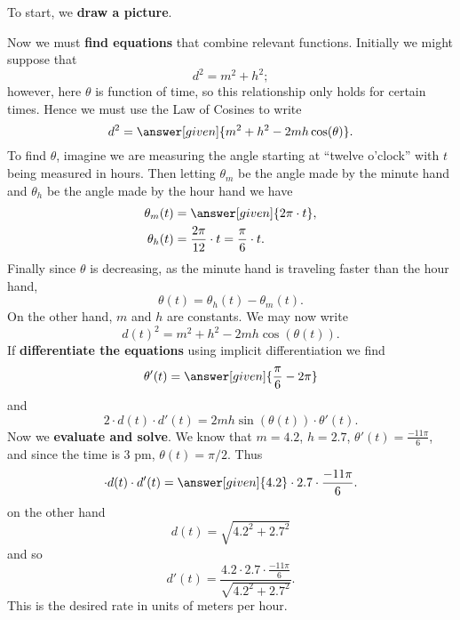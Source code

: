 \documentclass{ximera}
\begin{document}
\begin{example}
  \begin{explanation}
    To start, we \textbf{draw a picture}.
    \begin{image}
    \end{image}
    Now we must \textbf{find equations} that combine relevant
    functions. Initially we might suppose that
    \[
    d^2 = m^2 + h^2;
    \]
    however, here $\theta$ is function of time, so this relationship
    only holds for certain times. Hence we must use the Law of Cosines
    to write
    \[
    d^2 = \answer[given]{m^2 + h^2 - 2mh\cos(\theta)}.
    \]
    To find $\theta$, imagine we are measuring the angle starting at
    ``twelve o'clock'' with $t$ being measured in hours. Then letting
    $\theta_m$ be the angle made by the minute hand and $\theta_h$ be
    the angle made by the hour hand we have
    \begin{align*}
      \theta_m(t) &= \answer[given]{2\pi \cdot t},\\
      \theta_h(t) &= \frac{2\pi}{12}\cdot t =\frac{\pi}{6}\cdot t.
    \end{align*}
    Finally since $\theta$ is decreasing, as the minute hand is
    traveling faster than the hour hand,
    \[
    \theta(t) = \theta_h(t) - \theta_m(t).
    \]
    On the other hand, $m$ and $h$ are constants. We may now write
    \[
    d(t)^2 = m^2 + h^2 - 2mh\cos(\theta(t)).
    \]
    If \textbf{differentiate the equations} using implicit
    differentiation we find
    \[
    \theta'(t) = \answer[given]{\frac{\pi}{6}-2\pi}
    \]
    and
    \[
    2\cdot d(t) \cdot d'(t)  = 2mh\sin(\theta(t))\cdot \theta'(t).
    \]
    Now we \textbf{evaluate and solve}.  We know that $m=4.2$,
    $h=2.7$, $\theta'(t) = \frac{-11\pi}{6}$, and since the time is $3$
    pm, $\theta(t) = \pi/2$. Thus
    \[
    \cdot d(t) \cdot d'(t)  = \answer[given]{4.2}\cdot 2.7\cdot \frac{-11\pi}{6}.
    \]
    on the other hand
    \[
    d(t) = \sqrt{4.2^2 + 2.7^2}
    \]
    and so
    \[
    d'(t) = \frac{4.2\cdot 2.7\cdot \frac{-11\pi}{6}}{\sqrt{4.2^2 + 2.7^2}}.
    \]
    This is the desired rate in units of meters per hour.
  \end{explanation}
\end{example}
\end{document}

